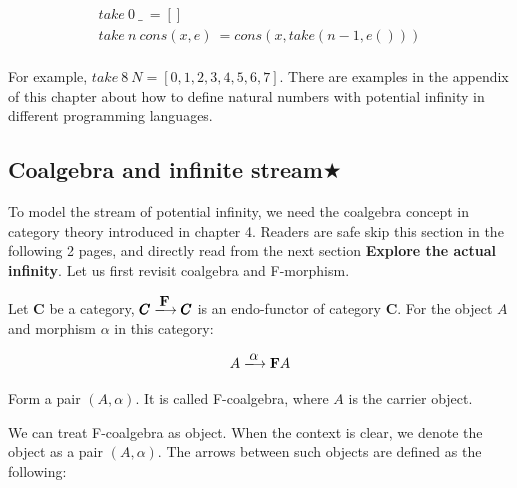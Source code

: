 \documentclass{article}
\begin{document}
\[
\begin{array}{l}
take\ 0\ \_\ = [] \\
take\ n\ cons(x, e)\ = cons(x, take(n-1, e())) \\
\end{array}
\]

For example, $take\ 8\ N = [0, 1, 2, 3, 4, 5, 6, 7]$. There are examples in the appendix of this chapter about how to define natural numbers with potential infinity in different programming languages.

\begin{Exercise}
\end{Exercise}

\subsection{Coalgebra and infinite stream$\bigstar$}

To model the stream of potential infinity, we need the coalgebra concept in category theory introduced in chapter 4. Readers are safe skip this section in the following 2 pages, and directly read from the next section \textbf{Explore the actual infinity}. Let us first revisit coalgebra and F-morphism.

\begin{definition}
\normalfont
Let $\pmb{C}$ be a category, $\pmb{C} \arrowto{\mathbf{F}} \pmb{C}$ is an endo-functor of category $\pmb{C}$. For the object $A$ and morphism $\alpha$ in this category:

\[
  A \arrowto{\alpha} \mathbf{F} A
\]

Form a pair $(A, \alpha)$. It is called F-coalgebra, where $A$ is the carrier object.
\end{definition}

We can treat F-coalgebra as object. When the context is clear, we denote the object as a pair $(A, \alpha)$. The arrows between such objects are defined as the following:
\end{document}
